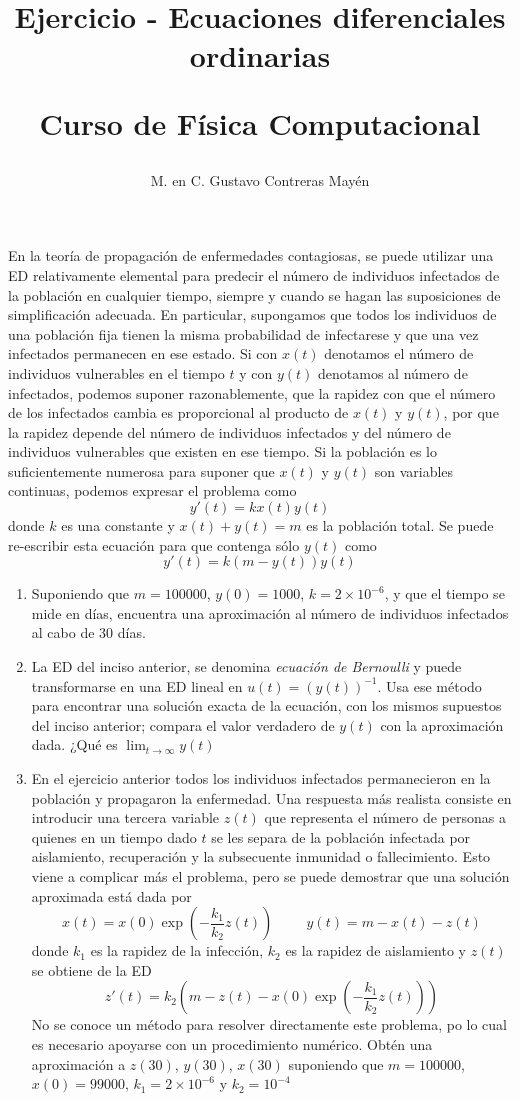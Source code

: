 \documentclass[letterpaper]{article}
\title{Ejercicio - Ecuaciones diferenciales ordinarias \\ \begin{large}Curso de Física Computacional\end{large}}
\author{M. en C. Gustavo Contreras Mayén}
\date{ }
\begin{document}
\maketitle
\fontsize{14}{14}\selectfont
{}
En la teoría de propagación de enfermedades contagiosas, se puede utilizar una ED relativamente elemental para predecir el número de individuos infectados de la población en cualquier tiempo, siempre y cuando se hagan las suposiciones de simplificación adecuada. En particular, supongamos que todos los individuos de una población fija tienen la misma probabilidad de infectarese y que una vez infectados permanecen en ese estado. Si con $x(t)$ denotamos el número de individuos vulnerables en el tiempo $t$ y con $y(t)$ denotamos al número de infectados, podemos suponer razonablemente, que la rapidez con que el número de los infectados cambia es proporcional al producto de $x(t)$ y $y(t)$, por que la rapidez depende del número de individuos infectados y del número de individuos vulnerables que existen en ese tiempo. Si la población es lo suficientemente numerosa para suponer que $x(t)$ y $y(t)$ son variables continuas, podemos expresar el problema como
\[y'(t) = k x(t) y(t)\]
donde $k$ es una constante y $x(t)+ y(t) = m$ es la población total. Se puede re-escribir esta ecuación para que contenga sólo $y(t)$ como
\[ y'(t) = k (m-y(t)) y(t)\]
\begin{enumerate}
\item Suponiendo que $m=100000$, $y(0)=1000$, $k=2 \times 10^{-6}$, y que el tiempo se mide en días, encuentra una aproximación al número de individuos infectados al cabo de 30 días.
\item La ED del inciso anterior, se denomina \emph{ecuación de Bernoulli} y puede transformarse en una ED lineal en $u(t) = (y(t))^{-1}$. Usa ese método para encontrar una solución exacta de la ecuación, con los mismos supuestos del inciso anterior; compara el valor verdadero de $y(t)$ con la aproximación dada. ¿Qué es $\displaystyle\lim_{t \rightarrow \infty} y(t)$
\item En el ejercicio anterior todos los individuos infectados permanecieron en la población y propagaron la enfermedad. Una respuesta más realista consiste en introducir una tercera variable $z(t)$ que representa el número de personas a quienes en un tiempo dado $t$ se les separa de la población infectada por aislamiento, recuperación y la subsecuente inmunidad o fallecimiento. Esto viene a complicar más el problema, pero se puede demostrar que una solución aproximada está dada por
\[ x(t) = x(0) \exp\left(- \frac{k_{1}}{k_{2}}z(t)\right) \hspace{1cm} y(t) =m - x(t) - z(t) \]
donde $k_{1}$ es la rapidez de la infección, $k_{2}$ es la rapidez de aislamiento y $z(t)$ se obtiene de la ED
\[ z'(t) = k_{2} \left( m - z(t) - x(0) \exp \left( - \frac{k_{1}}{k_{2}} z(t) \right) \right)\]
No se conoce un método para resolver directamente este problema, po lo cual es necesario apoyarse con un procedimiento numérico. Obtén una aproximación a $z(30)$, $y(30)$, $x(30)$ suponiendo que $m=100000$, $x(0)=99000$, $k_{1} = 2 \times 10^{-6}$ y $k_{2} = 10^{-4}$
\end{enumerate}
\end{document}
